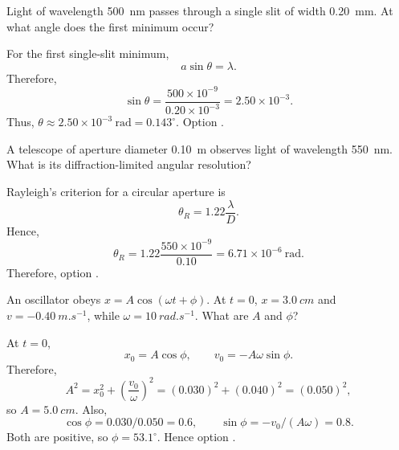 \begin{quizquestion}[
  id=phy104-opt-019,
  topic=optics,
  difficulty=foundation,
  marks=1,
  correct=E,
  tags={single-slit,diffraction,first-minimum},
  outcome={Calculate the first single-slit minimum angle}
]
  Light of wavelength \SI{500}{nm} passes through a single slit of width \SI{0.20}{mm}. At what angle does the first minimum occur?
\end{quizquestion}
\begin{quizsolution}
  For the first single-slit minimum,
    \[
      a\sin\theta=\lambda.
    \]
    Therefore,
    \[
      \sin\theta=\frac{500\times10^{-9}}{0.20\times10^{-3}}=2.50\times10^{-3}.
    \]
    Thus, \(\theta\approx2.50\times10^{-3}\ \mathrm{rad}=0.143^\circ\). Option \textbf{\quizcorrectletter}.
\end{quizsolution}

\begin{quizquestion}[
  id=phy104-opt-020,
  topic=optics,
  difficulty=foundation,
  marks=1,
  correct=C,
  tags={rayleigh-criterion,resolution,aperture},
  outcome={Calculate diffraction-limited angular resolution}
]
  A telescope of aperture diameter \SI{0.10}{m} observes light of wavelength \SI{550}{nm}. What is its diffraction-limited angular resolution?
\end{quizquestion}
\begin{quizsolution}
  Rayleigh's criterion for a circular aperture is
    \[
      \theta_R=1.22\frac{\lambda}{D}.
    \]
    Hence,
    \[
      \theta_R=1.22\frac{550\times10^{-9}}{0.10}
      =6.71\times10^{-6}\ \mathrm{rad}.
    \]
    Therefore, option \textbf{\quizcorrectletter}.
\end{quizsolution}

\begin{quizquestion}[
  id=phy104-osc-021,
  topic=oscillations,
  difficulty=applied,
  marks=2,
  correct=B,
  tags={shm,initial-conditions,phase-constant},
  outcome={Determine amplitude and phase from initial conditions}
]
  An oscillator obeys \(x=A\cos(\omega t+\phi)\). At \(t=0\), \(x=\SI{3.0}{cm}\) and \(v=\SI{-0.40}{m.s^{-1}}\), while \(\omega=\SI{10}{rad.s^{-1}}\). What are \(A\) and \(\phi\)?
\end{quizquestion}
\begin{quizsolution}
  At \(t=0\),
    \[
      x_0=A\cos\phi,\qquad v_0=-A\omega\sin\phi.
    \]
    Therefore,
    \[
      A^2=x_0^2+{\left(\frac{v_0}{\omega}\right)}^2
      ={(0.030)}^2+{(0.040)}^2={(0.050)}^2,
    \]
    so \(A=\SI{5.0}{cm}\). Also,
    \[
      \cos\phi=0.030/0.050=0.6,
      \qquad
      \sin\phi=-v_0/(A\omega)=0.8.
    \]
    Both are positive, so \(\phi=53.1^\circ\). Hence option \textbf{\quizcorrectletter}.
\end{quizsolution}

